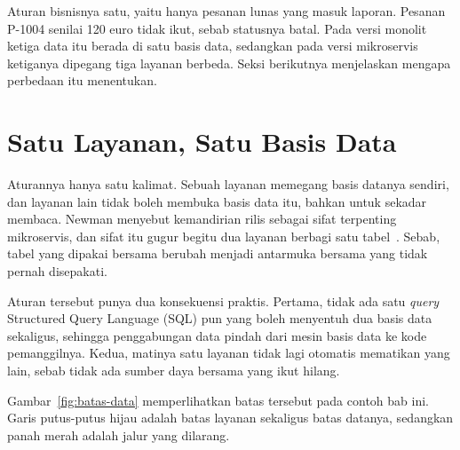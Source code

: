 Aturan bisnisnya satu, yaitu hanya pesanan lunas yang masuk laporan. Pesanan
P-1004 senilai 120 euro tidak ikut, sebab statusnya batal. Pada versi monolit
ketiga data itu berada di satu basis data, sedangkan pada versi mikroservis
ketiganya dipegang tiga layanan berbeda. Seksi berikutnya menjelaskan mengapa
perbedaan itu menentukan.

\section{Satu Layanan, Satu Basis Data}

Aturannya hanya satu kalimat. Sebuah layanan memegang basis datanya sendiri, dan
layanan lain tidak boleh membuka basis data itu, bahkan untuk sekadar membaca.
Newman menyebut kemandirian rilis sebagai sifat terpenting mikroservis, dan
sifat itu gugur begitu dua layanan berbagi satu tabel~\cite{newman2021building}.
Sebab, tabel yang dipakai bersama berubah menjadi antarmuka bersama yang tidak
pernah disepakati.

Aturan tersebut punya dua konsekuensi praktis. Pertama, tidak ada satu \textit{query}
Structured Query Language (SQL) pun yang boleh menyentuh dua basis data
sekaligus, sehingga penggabungan data pindah dari mesin basis data ke kode
pemanggilnya. Kedua, matinya satu layanan tidak lagi otomatis mematikan yang
lain, sebab tidak ada sumber daya bersama yang ikut hilang.

Gambar~\ref{fig:batas-data} memperlihatkan batas tersebut pada contoh bab ini.
Garis putus-putus hijau adalah batas layanan sekaligus batas datanya, sedangkan
panah merah adalah jalur yang dilarang.

